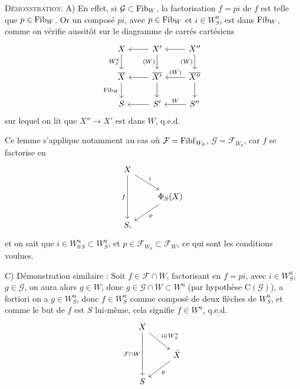 \textsc{Démonstration}. A) En effet, si $\mathcal{G} \subset \mathrm{Fib}_W$, la factorisation $f = pi$ de $f$ est telle que $p \in \mathrm{Fib}_W$. Or un composé $pi$, avec $p \in \mathrm{Fib}_W$ et $i \in W^{\mathrm{u}}_S$, est dans $\mathrm{Fib}_W$, comme on vérifie aussitôt sur le diagramme de carrés cartésiens
\[
\begin{tikzcd}
X \arrow[d, "W^{\mathrm{u}}_S"'] & X' \arrow[l] \arrow[d, "(W)"'] & X'' \arrow[l] \arrow[d, "(W)"'] \\
\overline{X} \arrow[d, "\Fib_W"'] & \overline{X'} \arrow[l] \arrow[d] & \overline{X''} \arrow[l, "(W)"'] \arrow[d] \\
S & S' \arrow[l] & S'' \arrow[l, "W"']
\end{tikzcd}
\]
sur lequel on lit que $X'' \longrightarrow X'$ est dans $W$, q.e.d.

Ce lemme s'applique notamment au cas où $\mathcal{F} = \mathrm{Fibf}_{W_0}$, $\mathcal{G} = \mathcal{F}_{W_0}$, car $f$ se factorise en
\[
\begin{tikzcd}
X \arrow[dr, "i"] \arrow[dd, "f"'] & \\
& \Phi_S(X) \arrow[dl, "p"] \\
S, &
\end{tikzcd}
\]
et on sait que $i \in W^{\mathrm{u}}_{0\,S} \subset W^{\mathrm{u}}_S$, et $p \in \mathcal{F}_{W_0} \subset \mathcal{F}_W$, ce qui sont les conditions voulues.

C) Démonstration similaire : Soit $f \in \mathcal{F} \cap W$, factorisant en $f = pi$, avec $i \in W^{\mathrm{u}}_S$, $g \in \mathcal{G}$, on aura alors $g \in W$, donc $g \in \mathcal{G} \cap W \subset W^{\mathrm{u}}$ (par hypothèse $\mathrm{C}(\mathcal{G})$), a fortiori on a $g \in W^{\mathrm{u}}_S$, donc $f \in W^{\mathrm{u}}_S$ comme composé de deux flèches de $W^{\mathrm{u}}_S$, et comme le but de $f$ est $S$ lui-même, cela signifie $f \in W^{\mathrm{u}}$, q.e.d.
\[
\begin{tikzcd}
X \arrow[dr, "i\in W^{\mathrm{u}}_S"] \arrow[dd, "\mathcal{F}\cap W"'] & \\
& \bar{X} \arrow[dl, "g"] \\
S &
\end{tikzcd}
\]

